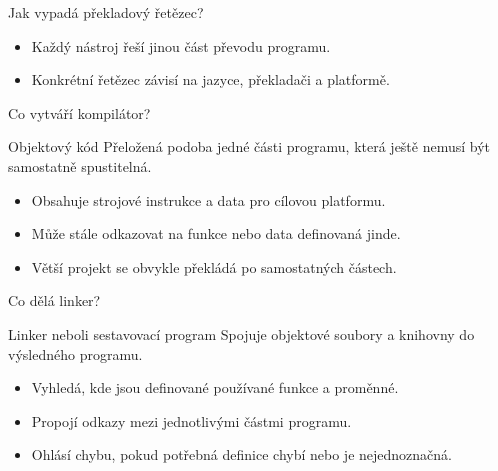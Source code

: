 \documentclass[aspectratio=169]{beamer}
\begin{document}
\begin{frame}{Jak vypadá překladový řetězec?}
  \centering
  \vspace{0.8cm}
  \begin{itemize}
    \item Každý nástroj řeší jinou část převodu programu.
    \item Konkrétní řetězec závisí na jazyce, překladači a platformě.
  \end{itemize}
\end{frame}

\begin{frame}{Co vytváří kompilátor?}
  \begin{block}{Objektový kód}
    Přeložená podoba jedné části programu, která ještě nemusí být samostatně spustitelná.
  \end{block}
  \begin{itemize}
    \item Obsahuje strojové instrukce a data pro cílovou platformu.
    \item Může stále odkazovat na funkce nebo data definovaná jinde.
    \item Větší projekt se obvykle překládá po samostatných částech.
  \end{itemize}
\end{frame}

\begin{frame}{Co dělá linker?}
  \begin{block}{Linker neboli sestavovací program}
    Spojuje objektové soubory a knihovny do výsledného programu.
  \end{block}
  \begin{itemize}
    \item Vyhledá, kde jsou definované používané funkce a proměnné.
    \item Propojí odkazy mezi jednotlivými částmi programu.
    \item Ohlásí chybu, pokud potřebná definice chybí nebo je nejednoznačná.
  \end{itemize}
\end{frame}
\end{document}
